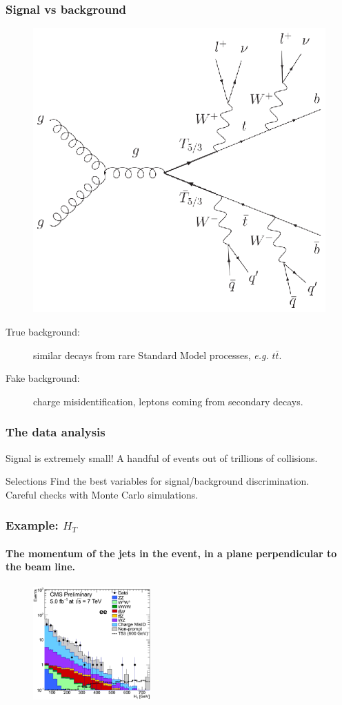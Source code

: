 \documentclass[ukenglish]{beamer}
\begin{document}
\begin{frame}
    \frametitle{Signal vs background}
    \begin{figure}[h]
        \centering
            \includegraphics[width=.5\textwidth]{toppartner_decay}
    \end{figure}
    \begin{description}
        \item[True background:] similar decays from rare Standard Model
            processes, \emph{e.g.} $t\bar t$.
        \item[Fake background:] charge misidentification, leptons coming
            from secondary decays.
    \end{description}
\end{frame}

\begin{frame}
    \frametitle{The data analysis}
    Signal is extremely small! A handful of events out 
    of trillions of collisions.
    \begin{block}
        {Selections}
        Find the best variables for signal/background discrimination.\\
        Careful checks with Monte Carlo simulations.
    \end{block}
\end{frame}

\begin{frame}
    \frametitle{Example: $H_T$}
    \framesubtitle{The momentum of the jets in the event, in a plane
    perpendicular to the beam line.}
    \begin{figure}[h]
        \centering
            \includegraphics[width=0.4\textwidth]{ht}
    \end{figure}
\end{frame}
\end{document}
